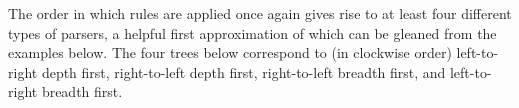 The order in which rules are applied once again gives rise to at least four different types of parsers, a helpful first approximation of which can be gleaned from the examples below.
The four trees below correspond to (in clockwise order) left-to-right depth first, right-to-left depth first, right-to-left breadth first, and left-to-right breadth first.
%
\begin{center}


\end{center}
